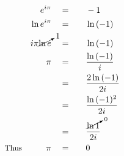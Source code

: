 \begin{alignat*}{5}
&\,&e^{i\pi}\quad&=\quad&&-1\\
&\,&\ln{e^{i\pi}}\quad&=&&\ln{(-1)}\\
&\,&i\pi\cancelto{1}{\ln e}\quad&=&&\ln{(-1)}\\
&\,&\pi\quad&=&&\frac{\ln{(-1)}}{i}\\
&\,&\,&=&&\frac{2\ln{(-1)}}{2i}\\
&\,&\,&=&&\frac{\ln{(-1)^2}}{2i}\\
&\,&\,&=&&\frac{\cancelto{0}{\ln{1}}}{2i}\\
&\small\text{Thus}&\pi\quad&=&&0
\end{alignat*}
